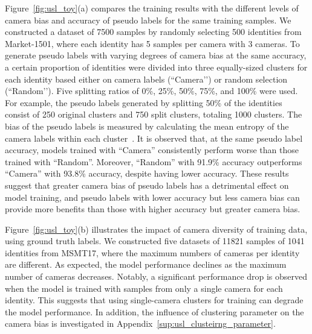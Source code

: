 Figure~\ref{fig:usl_toy}(a) compares the training results with the different levels of camera bias and accuracy of pseudo labels for the same training samples.
We constructed a dataset of 7500 samples by randomly selecting 500 identities from Market-1501, where each identity has 5 samples per camera with 3 cameras.
To generate pseudo labels with varying degrees of camera bias at the same accuracy, a certain proportion of identities were divided into three equally-sized clusters for each identity based either on camera labels (``Camera’’) or random selection (``Random’’).
Five splitting ratios of 0\%, 25\%, 50\%, 75\%, and 100\% were used.
For example, the pseudo labels generated by splitting 50\% of the identities consist of 250 original clusters and 750 split clusters, totaling 1000 clusters.
The bias of the pseudo labels is measured by calculating the mean entropy of the camera labels within each cluster~\citep{lee2023camera}.
It is observed that, at the same pseudo label accuracy, models trained with ``Camera'' consistently perform worse than those trained with ``Random''.
Moreover, ``Random'' with 91.9\% accuracy outperforms ``Camera'' with 93.8\% accuracy, despite having lower accuracy.
These results suggest that greater camera bias of pseudo labels has a detrimental effect on model training, and pseudo labels with lower accuracy but less camera bias can provide more benefits than those with higher accuracy but greater camera bias.

Figure~\ref{fig:usl_toy}(b) illustrates the impact of camera diversity of training data, using ground truth labels.
We constructed five datasets of 11821 samples of 1041 identities from MSMT17, where the maximum numbers of cameras per identity are different.
As expected, the model performance declines as the maximum number of cameras decreases.
Notably, a significant performance drop is observed when the model is trained with samples from only a single camera for each identity.
This suggests that using single-camera clusters for training can degrade the model performance.
In addition, the influence of clustering parameter on the camera bias is investigated in Appendix~\ref{sup:usl_clusteirng_parameter}.


